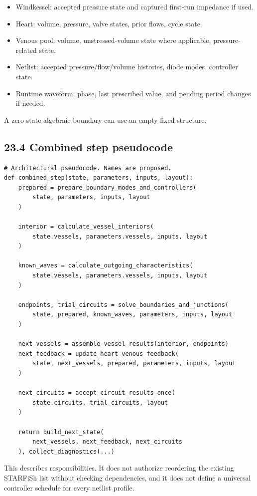 \documentclass[11pt,a4paper]{article}
\begin{document}
\begin{itemize}
\item Windkessel: accepted pressure state and captured first-run impedance if used.


\item Heart: volume, pressure, valve states, prior flows, cycle state.


\item Venous pool: volume, unstressed-volume state where applicable, pressure-related state.


\item Netlist: accepted pressure/flow/volume histories, diode modes, controller state.


\item Runtime waveform: phase, last prescribed value, and pending period changes if needed.


\end{itemize}
A zero-state algebraic boundary can use an empty fixed structure.

\subsection{23.4 Combined step pseudocode}

\begin{lstlisting}
# Architectural pseudocode. Names are proposed.
def combined_step(state, parameters, inputs, layout):
    prepared = prepare_boundary_modes_and_controllers(
        state, parameters, inputs, layout
    )

    interior = calculate_vessel_interiors(
        state.vessels, parameters.vessels, inputs, layout
    )

    known_waves = calculate_outgoing_characteristics(
        state.vessels, parameters.vessels, inputs, layout
    )

    endpoints, trial_circuits = solve_boundaries_and_junctions(
        state, prepared, known_waves, parameters, inputs, layout
    )

    next_vessels = assemble_vessel_results(interior, endpoints)
    next_feedback = update_heart_venous_feedback(
        state, next_vessels, prepared, parameters, inputs, layout
    )

    next_circuits = accept_circuit_results_once(
        state.circuits, trial_circuits, layout
    )

    return build_next_state(
        next_vessels, next_feedback, next_circuits
    ), collect_diagnostics(...)
\end{lstlisting}
This describes responsibilities. It does not authorize reordering the existing STARFiSh list without checking dependencies, and it does not define a universal controller schedule for every netlist profile.
\end{document}
